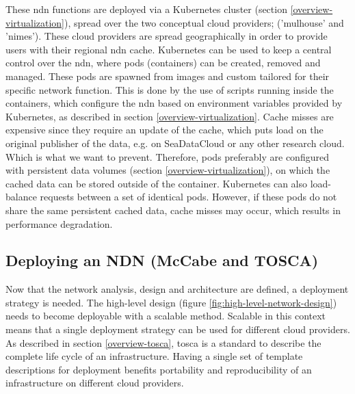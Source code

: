 
These \gls{ndn} functions are deployed via a Kubernetes cluster (section \ref{overview-virtualization}), spread over the two conceptual cloud providers; ('mulhouse' and 'nimes'). These cloud providers are spread geographically in order to provide users with their regional \gls{ndn} cache. Kubernetes can be used to keep a central control over the \gls{ndn}, where pods (containers) can be created, removed and managed. These pods are spawned from images and custom tailored for their specific network function. This is done by the use of scripts running inside the containers, which configure the \gls{ndn} based on environment variables provided by Kubernetes, as described in section \ref{overview-virtualization}. Cache misses are expensive since they require an update of the cache, which puts load on the original publisher of the data, e.g. on SeaDataCloud or any other research cloud. Which is what we want to prevent. Therefore, pods preferably are configured with persistent data volumes (section \ref{overview-virtualization}), on which the cached data can be stored outside of the container. Kubernetes can also load-balance requests between a set of identical pods. However, if these pods do not share the same persistent cached data, cache misses may occur, which results in performance degradation.

\subsection{Deploying an NDN (McCabe and TOSCA)}
\label{planning-deploying}
Now that the network analysis, design and architecture are defined, a deployment strategy is needed. The high-level design (figure \ref{fig:high-level-network-design}) needs to become deployable with a scalable method. Scalable in this context means that a single deployment strategy can be used for different cloud providers. As described in section \ref{overview-tosca}, \gls{tosca} is a standard to describe the complete life cycle of an infrastructure. Having a single set of template descriptions for deployment benefits portability and reproducibility of an infrastructure on different cloud providers.

